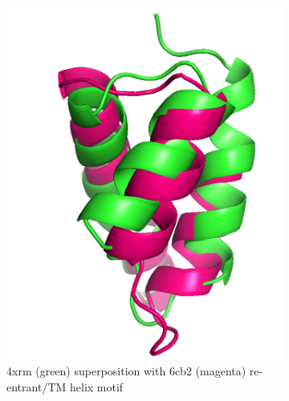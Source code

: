 \begin{figure}[htb]
    \centering %
\begin{subfigure}{0.3\textwidth}
  \includegraphics[width=\linewidth]{Results/4x_6c_super.png}
  \caption{4xrm (green) superposition with 6cb2 (magenta) re-entrant/TM helix motif}
  \label{fig:4xa}
\end{subfigure}\hfil %
\begin{subfigure}{0.3\textwidth}

\end{subfigure}
\end{figure}
